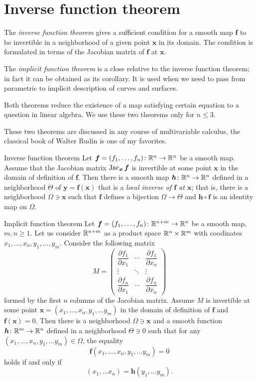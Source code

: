 \section*{Inverse function theorem}

The \emph{inverse function theorem} gives a sufficient condition for a smooth map $\bm{f}$ to be invertible in a neighborhood of a given point $\bm{x}$ in its domain.
The condition is formulated in terms of the Jacobian matrix of $\bm{f}$ at $\bm{x}$.

The \emph{implicit function theorem} is a close relative to the inverse function theorem;
in fact it can be obtained as its corollary.
It is used when we need to pass from parametric to implicit description of curves and surfaces.

Both theorems reduce the existence of a map satisfying certain equation to a question in linear algebra.
We use these two theorems only for $n\le 3$.

These two theorems are discussed in any course of multivariable calculus, the classical book of Walter Rudin \cite{rudin} is one of my favorites.

\begin{thm}{Inverse function theorem}\label{thm:inverse}
Let $\bm{f}=(f_1,\dots,f_n)\colon\mathbb{R}^n\to\mathbb{R}^n$ be a smooth map.
Assume that the Jacobian matrix
$\mathop{\rm Jac}\nolimits_{\bm{x}}\bm{f}$
is invertible at some point $\bm{x}$ in the domain of definition of $\bm{f}$.
Then there is a smooth map $\bm{h}\colon\mathbb{R}^n\to\mathbb{R}^n$ defined in a neighborhood $\Theta$ of ${\bm{y}}=\bm{f}(\bm{x})$ that is a \emph{local inverse of $\bm{f}$ at $\bm{x}$};
that is, there is a neighborhood $\Omega\ni \bm{x}$ such that
$\bm{f}$ defines a bijection $\Omega\to \Theta$ and
$\bm{h} \circ \bm{f}$ is an identity map on $\Omega$.
\end{thm}

\begin{thm}{Implicit function theorem}\label{thm:imlicit}
Let $\bm{f}=(f_1,\dots,f_n)\colon\mathbb{R}^{n+m}\to\mathbb{R}^n$ be a smooth map,
$m,n\ge 1$.
Let us consider $\mathbb{R}^{n+m}$ as a product space $\mathbb{R}^n\times \mathbb{R}^m$ with coodinates 
$x_1,\dots,x_n,y_1,\dots,y_m$.
Consider the following matrix 
\[
M=\begin{pmatrix}
\dfrac{\partial f_1}{\partial x_1} & \cdots & \dfrac{\partial f_1}{\partial x_n}\\
\vdots & \ddots & \vdots\\
\dfrac{\partial f_n}{\partial x_1} & \cdots & \dfrac{\partial f_n}{\partial x_n} \end{pmatrix}\]
formed by the first $n$ columns of the Jacobian matrix.
Assume $M$ is invertible at some point $\bm{x}=(x_1,\dots,x_n,y_1,\dots y_m)$ in the domain of definition of $\bm{f}$ and $\bm{f}(\bm{x})=0$.
Then there is a neighborhood $\Omega\ni \bm{x}$
and a smooth function $\bm{h}\colon\mathbb{R}^m\to\mathbb{R}^n$ defined in a neighborhood $\Theta\ni 0$ such that
for any $(x_1,\dots,x_n,y_1,\dots y_m)\in \Omega$, the equality
\[\bm{f}(x_1,\dots,x_n,y_1,\dots y_m)=0\]
holds if and only if 
\[(x_1,\dots x_n)=\bm{h}(y_1,\dots y_m).\]

\end{thm}

